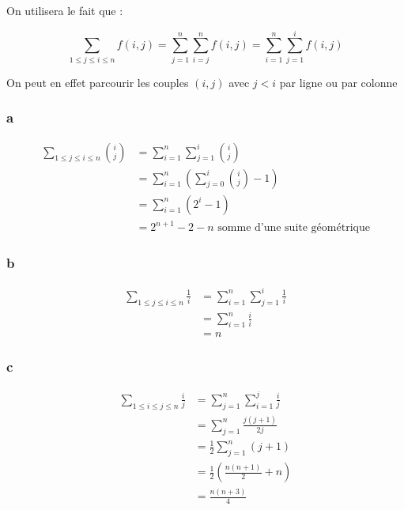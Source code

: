 \documentclass{report}
\begin{document}
On utilisera le fait que :

\begin{displaymath}
	\sum_{1\le j \le i \le n} f(i,j) = \sum_{j=1}^{n} \sum_{i=j}^{n} f(i,j) = \sum_{i=1}^{n} \sum_{j=1}^{i} f(i,j)
\end{displaymath}

On peut en effet parcourir les couples $(i, j)$ avec $j<i$ par ligne ou par colonne

\subsubsection*{a}
\begin{equation*}
	\begin{split}
		\sum_{1\le j \le i \le n} \binom{i}{j}
		&= \sum_{i=1}^{n} \sum_{j=1}^{i} \binom{i}{j} \\
		&= \sum_{i=1}^{n} \left(\sum_{j=0}^{i} \binom{i}{j} -1\right)\\
		&= \sum_{i=1}^{n} (2^i -1)\\
		&= 2^{n+1} - 2 - n \text{ somme d'une suite géométrique}
	\end{split}
\end{equation*}

\subsubsection*{b}
\begin{equation*}
	\begin{split}
		\sum_{1\le j \le i \le n} \frac{1}{i}
		&= \sum_{i=1}^{n} \sum_{j=1}^{i} \frac{1}{i} \\
		&= \sum_{i=1}^{n} \frac{i}{i} \\
		&= n
	\end{split}
\end{equation*}

\subsubsection*{c}
\begin{equation*}
	\begin{split}
		\sum_{1\le i \le j \le n} \frac{i}{j}
		&= \sum_{j=1}^{n} \sum_{i=1}^{j} \frac{i}{j} \\
		&= \sum_{j=1}^{n} \frac{j(j+1)}{2j} \\
		&= \frac{1}{2}\sum_{j=1}^{n} (j+1) \\
		&= \frac{1}{2} \left(\frac{n(n+1)}{2} + n\right) \\
		&= \frac{n(n+3)}{4}
	\end{split}
\end{equation*}
\end{document}
